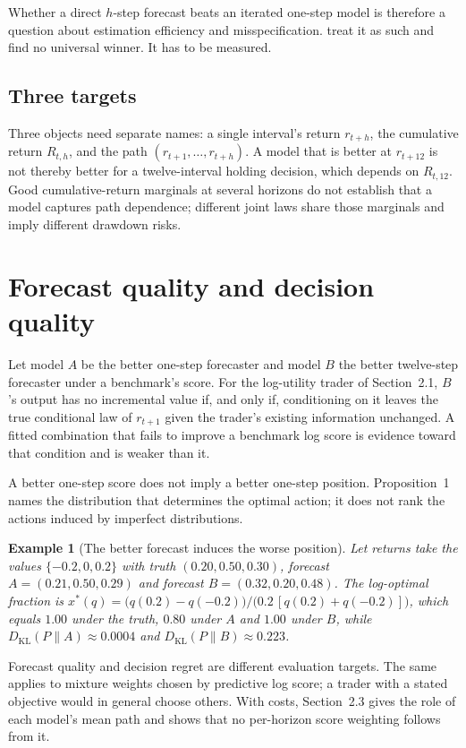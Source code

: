 \documentclass[11pt]{article}
\newtheorem{example}{Example}
\newcommand{\KL}{D_{\mathrm{KL}}}
\begin{document}
Whether a direct $h$-step forecast beats an iterated one-step model is therefore a question about estimation efficiency and misspecification. \citet{marcellino2006} treat it as such and find no universal winner. It has to be measured.

\subsection{Three targets}

Three objects need separate names: a single interval's return $r_{t+h}$, the cumulative return $R_{t,h}$, and the path $(r_{t+1}, \dots, r_{t+h})$. A model that is better at $r_{t+12}$ is not thereby better for a twelve-interval holding decision, which depends on $R_{t,12}$. Good cumulative-return marginals at several horizons do not establish that a model captures path dependence; different joint laws share those marginals and imply different drawdown risks.

\section{Forecast quality and decision quality}

Let model $A$ be the better one-step forecaster and model $B$ the better twelve-step forecaster under a benchmark's score. For the log-utility trader of Section~2.1, $B$'s output has no incremental value if, and only if, conditioning on it leaves the true conditional law of $r_{t+1}$ given the trader's existing information unchanged. A fitted combination that fails to improve a benchmark log score is evidence toward that condition and is weaker than it.

A better one-step score does not imply a better one-step position. Proposition~1 names the distribution that determines the optimal action; it does not rank the actions induced by imperfect distributions.

\begin{example}[The better forecast induces the worse position]
Let returns take the values $\{-0.2, 0, 0.2\}$ with truth $(0.20, 0.50, 0.30)$, forecast $A = (0.21, 0.50, 0.29)$ and forecast $B = (0.32, 0.20, 0.48)$. The log-optimal fraction is $x^\ast(q) = \big(q(0.2) - q(-0.2)\big)/\big(0.2\,[q(0.2) + q(-0.2)]\big)$, which equals $1.00$ under the truth, $0.80$ under $A$ and $1.00$ under $B$, while $\KL(P\|A) \approx 0.0004$ and $\KL(P\|B) \approx 0.223$.
\end{example}

Forecast quality and decision regret are different evaluation targets. The same applies to mixture weights chosen by predictive log score; a trader with a stated objective would in general choose others. With costs, Section~2.3 gives the role of each model's mean path and shows that no per-horizon score weighting follows from it.
\end{document}
